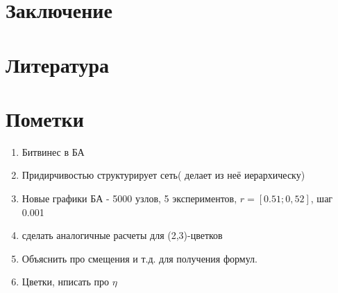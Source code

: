 \documentclass[10pt,aps,pra]{revtex4-1}
\begin{document}
\section{Заключение}

\section{Литература}


 

\section*{Пометки}
\begin{enumerate}
\item Битвинес в БА
\item Придирчивостью структурирует сеть( делает из неё иерархическу)
\item Новые графики БА - 5000 узлов, 5 экспериментов, $r=[0.51;0,52]$, шаг 0.001
\item сделать аналогичные расчеты для (2,3)-цветков
\item Объяснить про смещения и т.д. для получения формул.
\item Цветки, нписать про $\eta$
\end{enumerate}
\end{document}
